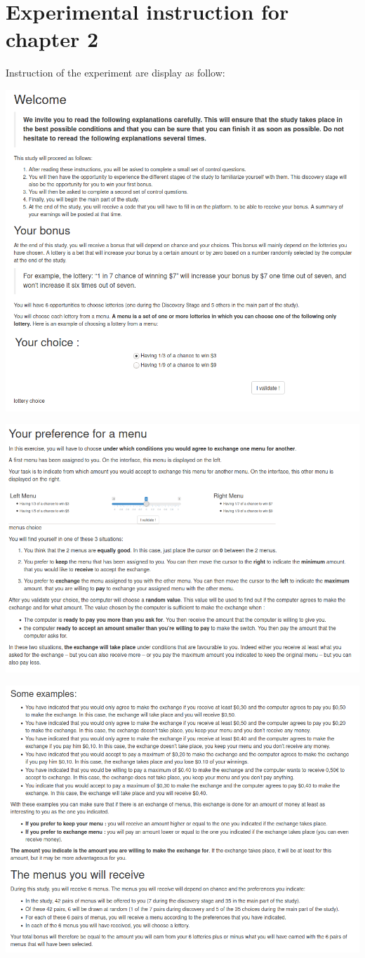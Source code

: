 \documentclass[
]{book}
\begin{document}
\hypertarget{expe-instruc3}{%
\chapter{Experimental instruction for chapter 2}\label{expe-instruc3}}

Instruction of the experiment are display as follow:

\includegraphics[width=0.9\linewidth]{annexe_file/consigne_c3_1}

\includegraphics[width=0.9\linewidth]{annexe_file/consigne_c3_2}

\includegraphics[width=0.9\linewidth]{annexe_file/consigne_c3_3}
\end{document}
